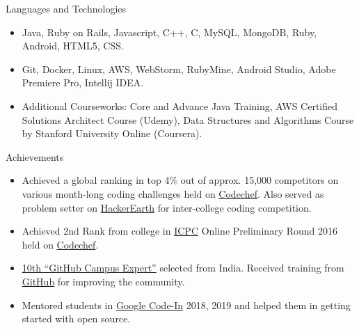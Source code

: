 \documentclass[]{mcdowellcv}
\begin{document}
	\begin{cvsection}{Languages and Technologies}
		\begin{cvsubsection}{}{}{}	
			\begin{itemize}
				\item Java, Ruby on Rails, Javascript, C++, C, MySQL, MongoDB, Ruby, Android, HTML5, CSS.
				\item Git, Docker, Linux, AWS, WebStorm, RubyMine, Android Studio, Adobe Premiere Pro, Intellij IDEA.
				\item Additional Courseworks: Core and Advance Java Training, AWS Certified Solutions Architect Course (Udemy), Data Structures and Algorithms Course by Stanford University Online (Coursera).
			\end{itemize}
		\end{cvsubsection}
	\end{cvsection}
	
	\begin{cvsection}{Achievements}
		\begin{cvsubsection}{}{}{}	
			\begin{itemize}
				\item Achieved a global ranking in top 4\% out of approx. 15,000 competitors on various month-long coding challenges held on \href {https://www.codechef.com/}{Codechef}. Also served as problem setter on \href {https://www.hackerearth.com/}{HackerEarth} for inter-college coding competition.
				\item Achieved 2nd Rank from college in \href {https://icpc.baylor.edu/}{ICPC} Online Preliminary Round 2016 held on \href {https://www.codechef.com/}{Codechef}.
				\item {\href {https://githubcampus.expert/sukhbir-singh/}{10th ``GitHub Campus Expert''}} selected from India. Received training from \href {https://github.com/}{GitHub} for improving the community.
				\item Mentored students in \href {https://codein.withgoogle.com/}{Google Code-In} 2018, 2019 and helped them in getting started with open source.
			\end{itemize}
		\end{cvsubsection}
	\end{cvsection}
	
\end{document}
